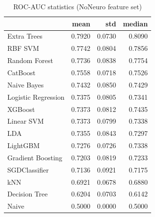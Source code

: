 \begin{table}
\caption{ROC-AUC statistics (NoNeuro feature set)}
\label{tab:roc-auc_NoNeuro_stats}
\begin{tabular}{lrrr}
\toprule
 & mean & std & median \\
\midrule
Extra Trees & 0.7920 & 0.0730 & 0.8090 \\
RBF SVM & 0.7742 & 0.0804 & 0.7856 \\
Random Forest & 0.7736 & 0.0838 & 0.7754 \\
CatBoost & 0.7558 & 0.0718 & 0.7526 \\
Naive Bayes & 0.7432 & 0.0850 & 0.7429 \\
Logistic Regression & 0.7375 & 0.0805 & 0.7341 \\
XGBoost & 0.7373 & 0.0812 & 0.7435 \\
Linear SVM & 0.7373 & 0.0799 & 0.7338 \\
LDA & 0.7355 & 0.0843 & 0.7297 \\
LightGBM & 0.7276 & 0.0726 & 0.7338 \\
Gradient Boosting & 0.7203 & 0.0819 & 0.7233 \\
SGDClassifier & 0.7136 & 0.0921 & 0.7175 \\
kNN & 0.6921 & 0.0678 & 0.6880 \\
Decision Tree & 0.6204 & 0.0703 & 0.6142 \\
Naive & 0.5000 & 0.0000 & 0.5000 \\
\bottomrule
\end{tabular}
\end{table}
